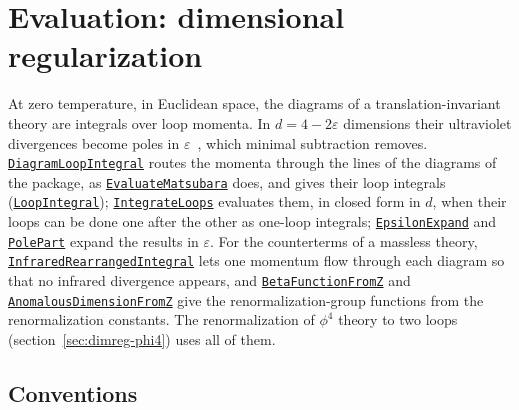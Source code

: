 \documentclass[11pt,a4paper]{article}
\newcommand{\pkg}[1]{\texttt{#1}}
\newcommand{\fnref}[1]{\hyperref[fn:#1]{\pkg{#1}}}
\begin{document}
\section{Evaluation: dimensional regularization}\label{sec:dimreg}

At zero temperature, in Euclidean space, the diagrams of a translation-invariant theory are integrals over loop
momenta. In $d=4-2\varepsilon$ dimensions their ultraviolet divergences become poles in
$\varepsilon$~\cite{tHooftVeltman1972,BolliniGiambiagi1972}, which minimal subtraction removes.
\fnref{DiagramLoopIntegral} routes the momenta through the lines of the diagrams of the package, as
\fnref{EvaluateMatsubara} does, and gives their loop integrals (\fnref{LoopIntegral}); \fnref{IntegrateLoops} evaluates
them, in closed form in $d$, when their loops can be done one after the other as one-loop integrals; \fnref{EpsilonExpand}
and \fnref{PolePart} expand the results in $\varepsilon$. For the counterterms of a massless theory,
\fnref{InfraredRearrangedIntegral} lets one momentum flow through each diagram so that no infrared divergence appears,
and \fnref{BetaFunctionFromZ} and \fnref{AnomalousDimensionFromZ} give the renormalization-group functions from the
renormalization constants. The renormalization of $\phi^4$ theory to two loops (section~\ref{sec:dimreg-phi4}) uses all
of them.

\subsection{Conventions}\label{sec:dimreg-conventions}
\end{document}
